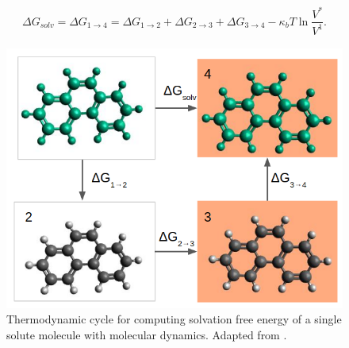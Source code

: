     \begin{equation}
    \label{eq:freesolv}
    \begin{aligned}
    \Delta G_{solv} = \Delta G_{1 \rightarrow 4} = \Delta G_{1 \rightarrow 2} + \Delta G_{2 \rightarrow 3} + \Delta G_{3 \rightarrow 4}  - \kappa_{b}T \ln \dfrac{V^{*}}{V^{1}} .
    \end{aligned}
    \end{equation}
      
    \begin{figure}[th]
    	\centering
    	\includegraphics[scale=0.6]{Figures/cicclotermo}
    	\caption{Thermodynamic cycle for computing solvation free energy of a single solute molecule with molecular dynamics. Adapted from .}
    	\label{thermcy}
    \end{figure}
    
